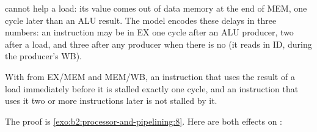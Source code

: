  cannot help a load: its value comes out of data memory at the end of MEM, one cycle later than an ALU
result. The model encodes these delays in three numbers: an instruction may be in EX one cycle after an ALU producer,
two after a load, and three after any producer when there is no  (it reads in ID, during the producer's
WB).

\begin{proposition}\label{prop:b2:processor-and-pipelining:load-use}
With  from EX/MEM and MEM/WB, an instruction that uses the result of a load immediately before it is
stalled exactly one cycle, and an instruction that uses it two or more instructions later is not stalled by it.
\end{proposition}

The proof is \cref{exo:b2:processor-and-pipelining:8}. Here are both effects on :

\label{out:b2:processor-and-pipelining:load-use}

\label{out:b2:processor-and-pipelining:no-forwarding}


